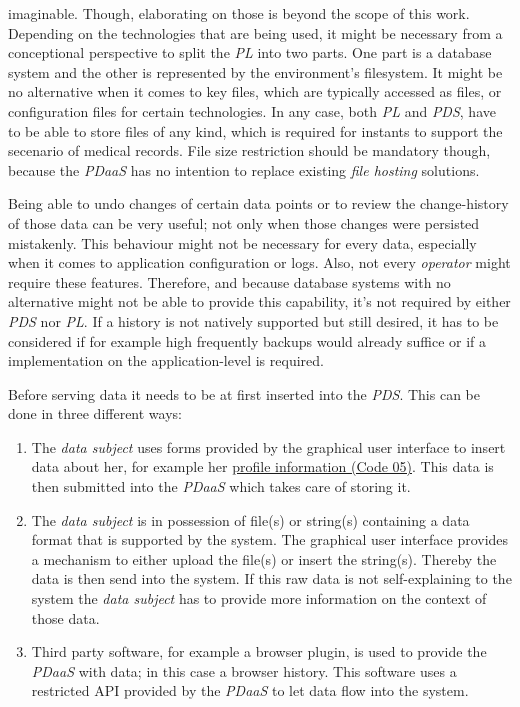 \documentclass[12pt,english,a4paper,titlepage,cleardoublepage=empty,dottedtoc]{report}
\providecommand{\tightlist}{%
  \setlength{\itemsep}{0pt}\setlength{\parskip}{0pt}}
\begin{document}
imaginable. Though, elaborating on those is beyond the scope of this
work. Depending on the technologies that are being used, it might be
necessary from a conceptional perspective to split the \emph{PL} into
two parts. One part is a database system and the other is represented by
the environment's filesystem. It might be no alternative when it comes
to key files, which are typically accessed as files, or configuration
files for certain technologies. In any case, both \emph{PL} and
\emph{PDS}, have to be able to store files of any kind, which is
required for instants to support the secenario of medical records. File
size restriction should be mandatory though, because the \emph{PDaaS}
has no intention to replace existing \emph{file hosting} solutions.

Being able to undo changes of certain data points or to review the
change-history of those data can be very useful; not only when those
changes were persisted mistakenly. This behaviour might not be necessary
for every data, especially when it comes to application configuration or
logs. Also, not every \emph{operator} might require these features.
Therefore, and because database systems with no alternative might not be
able to provide this capability, it's not required by either \emph{PDS}
nor \emph{PL}. If a history is not natively supported but still desired,
it has to be considered if for example high frequently backups would
already suffice or if a implementation on the application-level is
required.

Before serving data it needs to be at first inserted into the
\emph{PDS}. This can be done in three different ways:

\begin{enumerate}
\def\labelenumi{\alph{enumi})}
\tightlist
\item
  The \emph{data subject} uses forms provided by the graphical user
  interface to insert data about her, for example her
  \protect\hyperlink{code-05_struct_profile}{profile information (Code
  05)}. This data is then submitted into the \emph{PDaaS} which takes
  care of storing it.
\item
  The \emph{data subject} is in possession of file(s) or string(s)
  containing a data format that is supported by the system. The
  graphical user interface provides a mechanism to either upload the
  file(s) or insert the string(s). Thereby the data is then send into
  the system. If this raw data is not self-explaining to the system the
  \emph{data subject} has to provide more information on the context of
  those data.
\item
  Third party software, for example a browser plugin, is used to provide
  the \emph{PDaaS} with data; in this case a browser history. This
  software uses a restricted API provided by the \emph{PDaaS} to let
  data flow into the system.
\end{enumerate}
\end{document}
